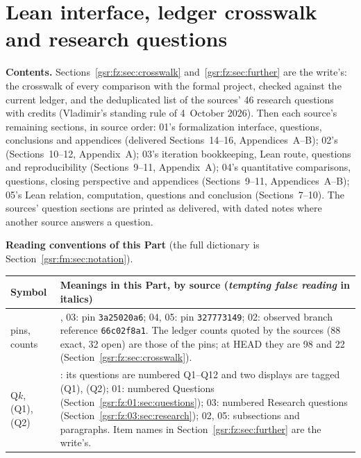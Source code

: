 \documentclass[11pt,letterpaper]{article}
\numberwithin{equation}{section}
\theoremstyle{definition}
\theoremstyle{remark}
\newcommand{\1}{\mathbf 1}
\newcommand{\partsource}[1]{\par\noindent\begin{minipage}{\textwidth}\small #1\end{minipage}\par\medskip}
\begin{document}

\clearpage
\part{Lean interface, ledger crosswalk and research questions}\label{gsr:fz:part}
\partsource{
\textbf{Contents.} Sections~\ref{gsr:fz:sec:crosswalk} and~\ref{gsr:fz:sec:further} are the write's: the crosswalk of every comparison with the formal project, checked against the current ledger, and the deduplicated list of the sources' 46 research questions with credits (Vladimir's standing rule of 4~October 2026). Then each source's remaining sections, in source order: 01's formalization interface, questions, conclusions and appendices (delivered Sections~14--16, Appendices~A--B); 02's (Sections~10--12, Appendix~A); 03's iteration bookkeeping, Lean route, questions and reproducibility (Sections~9--11, Appendix~A); 04's quantitative comparisons, questions, closing perspective and appendices (Sections~9--11, Appendices~A--B); 05's Lean relation, computation, questions and conclusion (Sections~7--10). The sources' question sections are printed as delivered, with dated notes where another source answers a question.
}
\noindent\textbf{Reading conventions of this Part} (the full dictionary is Section~\ref{gsr:fm:sec:notation}).
\begin{center}\small
\begin{tabular}{@{}>{\raggedright\arraybackslash}p{} >{\raggedright\arraybackslash}p{}@{}}
\toprule
Symbol & Meanings in this Part, by source (\emph{tempting false reading} in italics)\\
\midrule
pins, counts & 01, 03: pin \texttt{3a25020a6}; 04, 05: pin \texttt{327773149}; 02: observed branch reference \texttt{66c02f8a1}. The ledger counts quoted by the sources (88 exact, 32 open) are those of the pins; at HEAD they are 98 and 22 (Section~\ref{gsr:fz:sec:crosswalk}).\\
Q$k$, (Q1), (Q2) & 04: its questions are numbered Q1--Q12 and two displays are tagged (Q1), (Q2); 01: numbered Questions (Section~\ref{gsr:fz:01:sec:questions}); 03: numbered Research questions (Section~\ref{gsr:fz:03:sec:research}); 02, 05: subsections and paragraphs. Item names in Section~\ref{gsr:fz:sec:further} are the write's.\\
\bottomrule
\end{tabular}
\end{center}
\medskip
\end{document}
